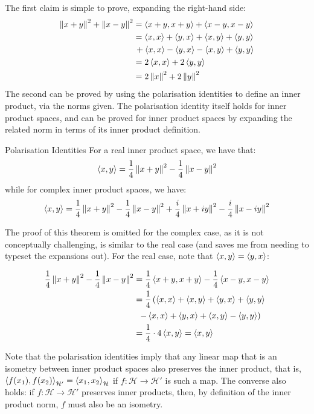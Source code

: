 \begin{bproof}{}{}
The first claim is simple to prove, expanding the right-hand side:
\begin{equation}
\begin{split}
    \left\lVert x+y \right\rVert^{2} + \left\lVert x-y \right\rVert^{2} &= \left\langle x+y, x+y \right\rangle + \left\langle x-y, x-y \right\rangle \\
     &= \left\langle x, x \right\rangle + \left\langle y, x \right\rangle + \left\langle x, y \right\rangle + \left\langle y, y \right\rangle \\
     & \, + \left\langle x, x \right\rangle - \left\langle y, x \right\rangle - \left\langle x, y \right\rangle + \left\langle y, y \right\rangle \\
     &= 2\left\langle x, x \right\rangle + 2\left\langle y, y \right\rangle \\
     &= 2\left\lVert x \right\rVert^{2} + 2\left\lVert y \right\rVert^{2}
\end{split}
\end{equation}
The second can be proved by using the polarisation identities to define an inner product, via the norms given. The polarisation identity itself holds for inner product spaces, and can be proved for inner product spaces by expanding the related norm in terms of its inner product definition.
\eop
\end{bproof}
\begin{btheorem}{Polarisation Identities}{}
For a real inner product space, we have that:
\[ \left\langle x, y \right\rangle = \frac{1}{4}\left\lVert x + y \right\rVert^{2} - \frac{1}{4} \left\lVert x - y \right\rVert^{2} \]
while for complex inner product spaces, we have:
\[ \left\langle x, y \right\rangle = \frac{1}{4}\left\lVert x + y \right\rVert^{2} - \frac{1}{4} \left\lVert x - y \right\rVert^{2} + \frac{i}{4} \left\lVert x + iy \right\rVert^{2} - \frac{i}{4} \left\lVert x - iy \right\rVert^{2}\]
\end{btheorem}
The proof of this theorem is omitted for the complex case, as it is not conceptually challenging, is similar to the real case (and saves me from needing to typeset the expansions out). For the real case, note that $\left\langle x, y \right\rangle = \left\langle y, x \right\rangle$:

\begin{equation}
\begin{split}
    \frac{1}{4}\left\lVert x + y \right\rVert^{2} - \frac{1}{4} \left\lVert x - y \right\rVert^{2} &= \frac{1}{4} \left\langle x+y, x+y \right\rangle - \frac{1}{4} \left\langle x-y, x-y \right\rangle \\
     &= \frac{1}{4}\left( \left\langle x, x \right\rangle + \left\langle x, y \right\rangle + \left\langle y, x \right\rangle + \left\langle y, y \right\rangle \right. \\
     & \,\,\, \left. - \left\langle x, x \right\rangle + \left\langle y, x \right\rangle + \left\langle x, y \right\rangle - \left\langle y, y \right\rangle  \right) \\
     &= \frac{1}{4} \cdot 4\left\langle x, y \right\rangle = \left\langle x, y \right\rangle
\end{split}
\end{equation}

Note that the polarisation identities imply that any linear map that is an isometry between inner product spaces also preserves the inner product, that is, \mbox{$\left\langle f(x_{1}), f(x_{2}) \right\rangle_{\mathcal{H}'} = \left\langle x_{1}, x_{2} \right\rangle_{\mathcal{H}}$} if $f: \mathcal{H} \to \mathcal{H'}$ is such a map. The converse also holds: if $f: \mathcal{H} \to \mathcal{H'}$ preserves inner products, then, by definition of the inner product norm, $f$ must also be an isometry. 

